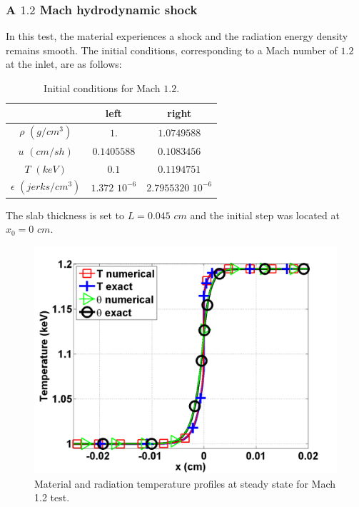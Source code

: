 \subsubsection{A $1.2$ Mach hydrodynamic shock}

In this test, the material experiences a shock and the radiation energy density remains smooth. The initial conditions, corresponding to a Mach number of $1.2$ at the inlet, are as follows: 
\begin{table}[H]
\caption{\label{tbl:table4} Initial conditions for Mach $1.2$.}
\begin{center}
\begin{tabular}{|c|c|c|}
\hline 
 & left  & right \\ \hline
$\rho$ $(g/cm^3)$ &$1.$ & $1.0749588$ \\ \hline
$u$ $(cm/sh)$& $0.1405588$ & $0.1083456$ \\ \hline
$T$ $(keV)$& $0.1$ & $0.1194751$\\ \hline
$\epsilon$ $(jerks/cm^3)$ & $1.372$ $10^{-6}$ & $2.7955320$ $10^{-6}$\\
\hline
\end{tabular}  
\end{center}  
\end{table}
The slab thickness is set to $L=0.045$ $cm$ and the initial step was located at $x_0 = 0$ $cm$. 
\begin{figure}[H]
       \centering
       \includegraphics[width=\textwidth]{figures/Mach_1p2_nel_1000_temperature.png}
       \caption{Material and radiation temperature profiles at steady state for Mach 1.2 test.}\label{fig:Mach12_temp}
\end{figure}
